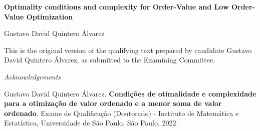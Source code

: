 \documentclass[11pt,oneside,a4paper]{book}
\newcommand{\autor}{Gustavo David Quintero Álvarez}
\newcommand{\titulo}{Optimality conditions and complexity for Order-Value and Low Order-Value Optimization}
\begin{document}
\newpage
\thispagestyle{empty}
    \begin{center}
 \begin{minipage}[t][56mm][s]{96mm}
          \vspace*{2cm plus 1.5cm minus 1.8cm}
          \centering
          {\Large \bfseries \titulo}\\[0.4cm]
           \vspace{1cm plus 1cm minus 0.6cm}

           {\Large\autor}

          \vspace*{2cm plus 1.5cm minus 1.8cm}
      \end{minipage}
     \end{center}
\vskip 2cm
   \begin{flushright}
      \begin{minipage}[t][50mm][s]{80mm}
        \begin{flushright}
          \normalsize{
          This is the original version of the qualifying text
          prepared by candidate Gustavo David Quintero Álvarez,
          as submitted to the Examining Committee. 
          }
        \end{flushright}
        \vspace*{0pt plus 50mm}
      \end{minipage}
      \par
  \end{flushright}

\afterpage{\blankpage}

\clearpage 
\thispagestyle{plain}
\begin{center}{\huge{\textit{Acknowledgements}} \par}\end{center}
\vspace{1em}
\lipsum[1]
\lipsum[1]
\vfil\vfil\null

\afterpage{\blankpage}
\clearpage %
 \thispagestyle{empty}
  \begin{flushleft}
    \setlength{\parskip}{0pt}
    { \par} 
    \bigskip
		\begin{center}
\noindent\begin{minipage}{0.75\textwidth}
\small{\autor. \textbf{Condições de otimalidade e complexidade para a otimização de valor ordenado e a menor soma de valor ordenado}. 
Exame de Qualificação (Doutorado) - Instituto de Matemática e Estatística,
Universidade de São Paulo, São Paulo, 2022.}
\end{minipage}
\end{center}
\end{flushleft}
\bigskip

\end{document}
